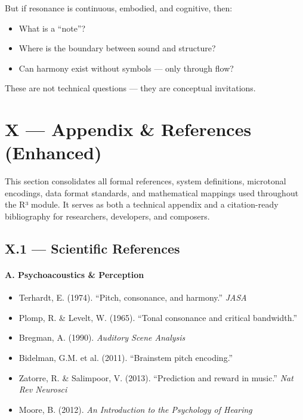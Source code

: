 \documentclass{article}
\begin{document}
But if resonance is continuous, embodied, and cognitive, then:

\begin{itemize}
    \item What is a “note”?
    \item Where is the boundary between sound and structure?
    \item Can harmony exist without symbols — only through flow?
\end{itemize}

These are not technical questions — they are conceptual invitations.

\section*{X — Appendix \& References (Enhanced)}

This section consolidates all formal references, system definitions, microtonal encodings, data format standards, and mathematical mappings used throughout the R³ module. It serves as both a technical appendix and a citation-ready bibliography for researchers, developers, and composers.

\subsection*{X.1 — Scientific References}

\paragraph{A. Psychoacoustics \& Perception}
\begin{itemize}
    \item Terhardt, E. (1974). “Pitch, consonance, and harmony.” \textit{JASA}
    \item Plomp, R. \& Levelt, W. (1965). “Tonal consonance and critical bandwidth.”
    \item Bregman, A. (1990). \textit{Auditory Scene Analysis}
    \item Bidelman, G.M. et al. (2011). “Brainstem pitch encoding.”
    \item Zatorre, R. \& Salimpoor, V. (2013). “Prediction and reward in music.” \textit{Nat Rev Neurosci}
    \item Moore, B. (2012). \textit{An Introduction to the Psychology of Hearing}
\end{itemize}
\end{document}
